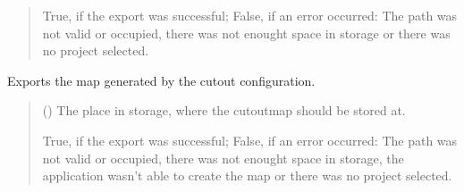 \documentclass[letterpaper,10pt,english]{sphinxmanual}
\begin{document}
\begin{fulllineitems}
\begin{fulllineitems}
\begin{quote}
\begin{description}
\sphinxAtStartPar
True, if the export was successful; False, if an error occurred: The path was not valid or occupied, there was not enought space in storage or there was no project selected.

\sphinxAtStartPar
{}

\end{description}\end{quote}

\end{fulllineitems}


\begin{fulllineitems}
\label{\detokenize{apidoc/src.osm_configurator.control:src.osm_configurator.control.control_interface.IControl.export_cut_out_map}}
\pysigstartsignatures
{}
\pysigstopsignatures
\sphinxAtStartPar
Exports the map generated by the cut\sphinxhyphen{}out configuration.
\begin{quote}\begin{description}
\sphinxAtStartPar
{} () \textendash{} The place in storage, where the cut\sphinxhyphen{}out\sphinxhyphen{}map should be stored at.

\sphinxAtStartPar
True, if the export was successful; False, if an error occurred: The path was not valid or occupied, there was not enought space in storage, the application wasn’t able to create the map or there was no project selected.

\sphinxAtStartPar
{}

\end{description}\end{quote}

\end{fulllineitems}



\end{fulllineitems}
\end{document}
